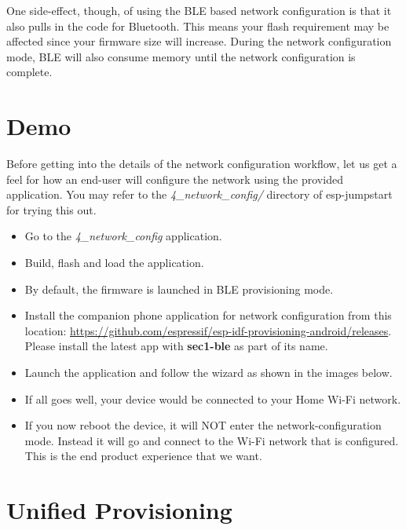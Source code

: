 \documentclass[main.tex]{subfiles}
\begin{document}
One side-effect, though, of using the BLE based network configuration is that it also pulls in the code for Bluetooth. This means your flash requirement may be affected since your firmware size will increase. During the network configuration mode, BLE will also consume memory until the network configuration is complete.


\section{Demo}
Before getting into the details of the network configuration workflow, let us get a feel for how an end-user will configure the network using the provided application.
You may refer to the \textit{4\_network\_config/} directory of esp-jumpstart for trying this out.

\begin{itemize}
    \item Go to the \textit{4\_network\_config} application.
    \item Build, flash and load the application.
    \item By default, the firmware is launched in BLE provisioning mode.
    \item Install the companion phone application for network configuration from this location: \url{https://github.com/espressif/esp-idf-provisioning-android/releases}. Please install the latest app with \textbf{sec1-ble} as part of its name.
    \item Launch the application and follow the wizard as shown in the images below.
\end{itemize}



\begin{itemize}
    \item If all goes well, your device would be connected to your Home Wi-Fi network.
    \item If you now reboot the device, it will NOT enter the network-configuration mode. Instead it will go and connect to the Wi-Fi network that is configured. This is the end product experience that we want.
\end{itemize}

 
\section{Unified Provisioning}\label{sec:unified_prov}
\end{document}
